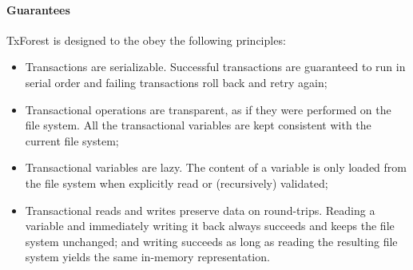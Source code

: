 
\paragraph{Guarantees}
TxForest is designed to the obey the following principles:
\begin{itemize} 
	\item Transactions are serializable. Successful transactions are guaranteed to run in serial order and failing transactions roll back and retry again;
	\item Transactional operations are transparent, as if they were performed on the file system. All the transactional variables are kept consistent with the current file system;
	\item Transactional variables are lazy. The content of a variable is only loaded from the file system when explicitly read or (recursively) validated;
	\item Transactional reads and writes preserve data on round-trips. Reading a variable and immediately writing it back always succeeds and keeps the file system unchanged; and writing succeeds as long as reading the resulting file system yields the same in-memory representation.
\end{itemize}




